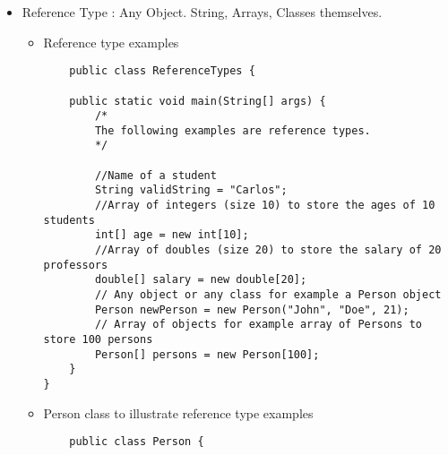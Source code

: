 \documentclass{article}
\begin{document}
\begin{itemize}
    \begin{itemize}
    \item example
    \begin{lstlisting}
    public static void main(String[] args) {
        char validChar = 'c';
        char otherValidChar = '\u0063';
        
        char invalidChar = 'abc';
    }
    \end{lstlisting}
    \end{itemize}
    
    \textbf{Booleans}: booleans. They can take true or false values. Their size is not precisely defined.
    \begin{itemize}
    \item example
    \begin{lstlisting}
    public static void main(String[] args) {
        boolean validBool = true;
        boolean otherValidBool = false;
    }
    \end{lstlisting}
    \end{itemize}
    
    \textbf{Check out the \texttt{ValueTypes.java} class to play around with examples of all value types in java and their declaration.}
    
    \item Reference Type : Any Object. String, Arrays, Classes themselves.
    \begin{itemize}
    \item Reference type examples
    \begin{lstlisting}
    public class ReferenceTypes {

    public static void main(String[] args) {
        /*
        The following examples are reference types.
        */

        //Name of a student
        String validString = "Carlos";
        //Array of integers (size 10) to store the ages of 10 students
        int[] age = new int[10]; 
        //Array of doubles (size 20) to store the salary of 20 professors
        double[] salary = new double[20];
        // Any object or any class for example a Person object
        Person newPerson = new Person("John", "Doe", 21);
        // Array of objects for example array of Persons to store 100 persons
        Person[] persons = new Person[100];
    }
}
    \end{lstlisting}
    \end{itemize}
    
    \begin{itemize}
    \item Person class to illustrate reference type examples
    \begin{lstlisting}
    public class Person {


\end{lstlisting}
\end{itemize}
\end{itemize}
\end{document}
